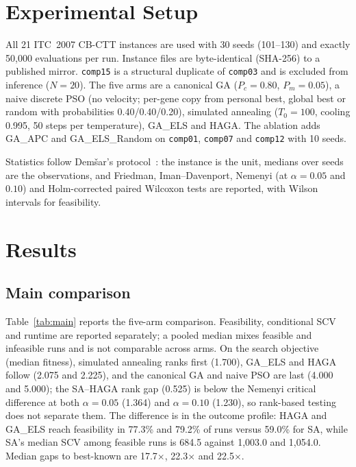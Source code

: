 \documentclass[journal]{IEEEtran}
\newcommand{\code}[1]{\texttt{#1}}
\begin{document}
\section{Experimental Setup}
All 21 ITC~2007 CB-CTT instances are used with 30 seeds (101--130) and exactly 50{,}000 evaluations per run. Instance files are byte-identical (SHA-256) to a published mirror. \code{comp15} is a structural duplicate of \code{comp03} and is excluded from inference ($N=20$). The five arms are a canonical GA ($P_c=0.80$, $P_m=0.05$), a naive discrete PSO (no velocity; per-gene copy from personal best, global best or random with probabilities 0.40/0.40/0.20), simulated annealing ($T_0=100$, cooling 0.995, 50 steps per temperature), GA\_ELS and HAGA. The ablation adds GA\_APC and GA\_ELS\_Random on \code{comp01}, \code{comp07} and \code{comp12} with 10 seeds.

Statistics follow Dem\v{s}ar's protocol~\cite{demsar2006statistical}: the instance is the unit, medians over seeds are the observations, and Friedman, Iman--Davenport, Nemenyi (at $\alpha=0.05$ and $0.10$) and Holm-corrected paired Wilcoxon tests are reported, with Wilson intervals for feasibility.

\section{Results}
\subsection{Main comparison}
Table~\ref{tab:main} reports the five-arm comparison. Feasibility, conditional SCV and runtime are reported separately; a pooled median mixes feasible and infeasible runs and is not comparable across arms. On the search objective (median fitness), simulated annealing ranks first (1.700), GA\_ELS and HAGA follow (2.075 and 2.225), and the canonical GA and naive PSO are last (4.000 and 5.000); the SA--HAGA rank gap (0.525) is below the Nemenyi critical difference at both $\alpha=0.05$ (1.364) and $\alpha=0.10$ (1.230), so rank-based testing does not separate them. The difference is in the outcome profile: HAGA and GA\_ELS reach feasibility in 77.3\% and 79.2\% of runs versus 59.0\% for SA, while SA's median SCV among feasible runs is 684.5 against 1{,}003.0 and 1{,}054.0. Median gaps to best-known are 17.7$\times$, 22.3$\times$ and 22.5$\times$.
\end{document}
